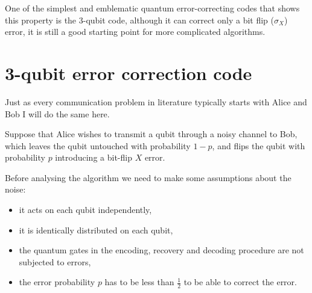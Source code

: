 One of the simplest and emblematic quantum error-correcting codes that shows this property is the 3-qubit code, although it can correct only a bit flip ($\sigma_X$) error, it is still a good starting point for more complicated algorithms.


\section{3-qubit error correction code}

Just as every communication problem in literature typically starts with Alice and Bob I will do the same here.

Suppose that Alice wishes to transmit a qubit through a noisy channel to Bob, which leaves the qubit untouched with probability $1-p$, and flips the qubit with probability $p$ introducing a bit-flip $X$ error.

Before analysing the algorithm we need to make some assumptions about the noise\cite{SteaneTut}: \begin{itemize}
    \item it acts on each qubit independently,
    \item it is identically distributed on each qubit,
    \item the quantum gates in the encoding, recovery and decoding procedure are not subjected to errors,
    \item the error probability $p$ has to be less than $\frac{1}{2}$ to be able to correct the error.
    \label{item: noise}
\end{itemize}

